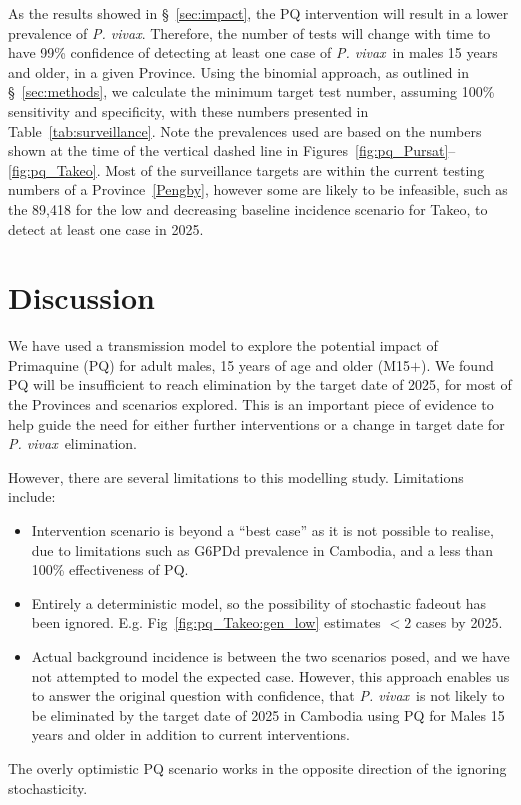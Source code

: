 \documentclass[doublespacing]{bmcart}
\newcommand{\pv}{\textit{P. vivax}}
\newcommand{\males}{M15$+$}
\begin{document}
As the results showed in \S~\ref{sec:impact}, the PQ intervention will result in a lower prevalence of \pv. Therefore, the number of tests will change with time to have 99\% confidence of detecting at least one case of \pv~in males 15 years and older, in a given Province. Using the binomial approach, as outlined in \S~\ref{sec:methods}, we calculate the minimum target test number, assuming 100\% sensitivity and specificity, with these numbers presented in Table~\ref{tab:surveillance}. Note the prevalences used are based on the numbers shown at the time of the vertical dashed line in Figures~\ref{fig:pq_Pursat}--\ref{fig:pq_Takeo}. Most of the surveillance targets are within the current testing numbers of a Province~\ref{Pengby}, however some are likely to be infeasible, such as the 89,418 for the low and decreasing baseline incidence scenario for Takeo, to detect at least one case in 2025. 

\section*{Discussion}

We have used a transmission model to explore the potential impact of Primaquine (PQ) for adult males, 15 years of age and older (\males). We found PQ will be insufficient to reach elimination by the target date of 2025, for most of the Provinces and scenarios explored. This is an important piece of evidence to help guide the need for either further interventions or a change in target date for \pv~elimination. 

However, there are several limitations to this modelling study. Limitations include:
\begin{itemize}
\item Intervention scenario is beyond a ``best case'' as it is not possible to realise, due to limitations such as G6PDd prevalence in Cambodia, and a less than 100\% effectiveness of PQ. 
\item Entirely a deterministic model, so the possibility of stochastic fadeout has been ignored. E.g. Fig~\ref{fig:pq_Takeo:gen_low} estimates $<2$ cases by 2025.
\item Actual background incidence is between the two scenarios posed, and we have not attempted to model the expected case. However, this approach enables us to answer the original question with confidence, that \pv~is not likely to be eliminated by the target date of 2025 in Cambodia using PQ for Males 15 years and older in addition to current interventions.
\end{itemize}
The overly optimistic PQ scenario works in the opposite direction of the ignoring stochasticity. 
\end{document}

